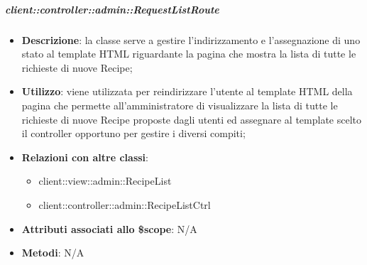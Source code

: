 		\subparagraph{client::controller::admin::RequestListRoute} %
		\label{subp:bdsm_app_client_controller_admin_recipelistroute}

			\begin{itemize}
				\item \textbf{Descrizione}: la classe serve a gestire l'indirizzamento e l'assegnazione di uno stato al template HTML riguardante la pagina che mostra la lista di tutte le richieste di nuove Recipe;
				\item \textbf{Utilizzo}: viene utilizzata per reindirizzare l'utente al template HTML della pagina che permette all'amministratore di visualizzare la lista di tutte le richieste di nuove Recipe proposte dagli utenti ed assegnare al template scelto il controller opportuno per gestire i diversi compiti;
				\item \textbf{Relazioni con altre classi}:
					\begin{itemize}
						\item client::view::admin::RecipeList
						\item client::controller::admin::RecipeListCtrl
					\end{itemize}
				\item \textbf{Attributi associati allo \$scope}: N/A
				\item \textbf{Metodi}: N/A
			\end{itemize}

